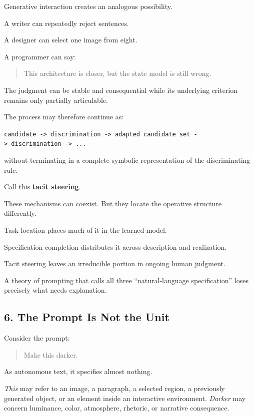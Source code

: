 \documentclass[
]{article}
\begin{document}
Generative interaction creates an analogous possibility.

A writer can repeatedly reject sentences.

A designer can select one image from eight.

A programmer can say:

\begin{quote}
This architecture is closer, but the state model is still wrong.
\end{quote}

The judgment can be stable and consequential while its underlying
criterion remains only partially articulable.

The process may therefore continue as:

\texttt{candidate\ -\textgreater{}\ discrimination\ -\textgreater{}\ adapted\ candidate\ set\ -\textgreater{}\ discrimination\ -\textgreater{}\ ...}

without terminating in a complete symbolic representation of the
discriminating rule.

Call this \textbf{tacit steering}.

These mechanisms can coexist. But they locate the operative structure
differently.

Task location places much of it in the learned model.

Specification completion distributes it across description and
realization.

Tacit steering leaves an irreducible portion in ongoing human judgment.

A theory of prompting that calls all three ``natural-language
specification'' loses precisely what needs explanation.

\subsection{6. The Prompt Is Not the
Unit}\label{the-prompt-is-not-the-unit}

Consider the prompt:

\begin{quote}
Make this darker.
\end{quote}

As autonomous text, it specifies almost nothing.

\emph{This} may refer to an image, a paragraph, a selected region, a
previously generated object, or an element inside an interactive
environment. \emph{Darker} may concern luminance, color, atmosphere,
rhetoric, or narrative consequence.
\end{document}
